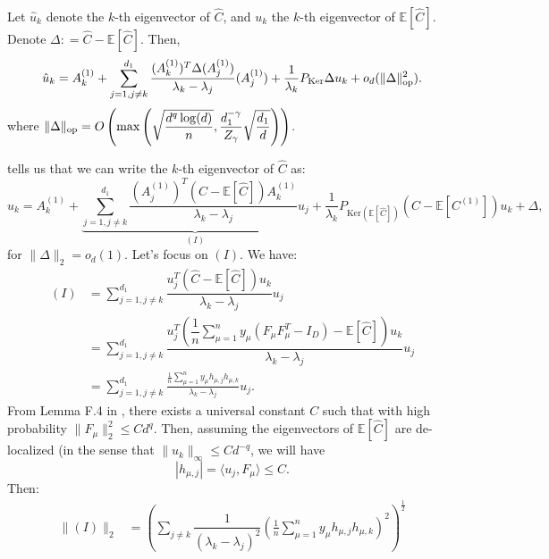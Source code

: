 \documentclass[]{article}
\numberwithin{equation}{section}
\theoremstyle{definition}
\newcommand{\EE}{\mathbb{E}}
\def\op{{\rm op}}
\begin{document}
\begin{lemma}
    Let $\hat{u}_{k}$ denote the $k$-th eigenvector of $\hat{C}$, and $u_{k}$ the $k$-th eigenvector of $\EE[\hat{C}]$. Denote $\Delta: = \hat{C} - \EE[\hat{C}]$. Then, 
    \[
      \hat{u}_{k} = A^{(1)}_{k }+\sum_{j=1, j\not = k}^{d_1} \dfrac{(A^{(1)}_{k})^T \Delta (A^{(1)}_{j})}{\lambda_{k} - \lambda_{j}} (A^{(1)}_{j}) + \dfrac{1}{\lambda_{k}}P_{\mathrm{Ker}} \Delta u_{k} + o_d(\| \Delta\|_\op^2) . 
    \]
    where $\| \Delta\|_\op = O \left ( \max\left ( \sqrt{\dfrac{d^{q}\log(d)}{n}}, \dfrac{d_1^{-\gamma}}{Z_\gamma}\sqrt{\dfrac{d_1}{d}} \right )\right )$. 
    \label{lemma:eigenvector_perturbation_identity}
\end{lemma}

 tells us that we can write the $k$-th eigenvector of $\hat{C}$ as: 
\begin{equation}
    \hat{u}_{k} = A^{(1)}_{k } + \underbrace{\sum_{j=1, j \not = k}^{d_1} \dfrac{(A^{(1)}_{j})^T (\hat{C} - \EE [\hat{C}])A^{(1)}_{k }}{ \lambda_k - \lambda_j } u_j}_{(I)} +\dfrac{1}{\lambda_{k}} P_{\mathrm{Ker}(\EE[\hat{C}])} (\hat{C} - \mathbb{E}[C^{(1)}] ) u_{k} + \Delta, 
    \label{eq:I_II_perturbation}
\end{equation}
for $\| \Delta\|_2 = o_{d}(1)$. Let's focus on $(I)$. We have: 
\begin{align}
    (I) & = \sum_{j=1,j \not = k}^{d_1} \dfrac{u_j^T (\hat{C} - \EE [\hat{C}])u_k}{ \lambda_k - \lambda_j } u_j \\
    & = \sum_{j=1,j \not = k}^{d_1} \dfrac{u_j^T (\dfrac{1}{n}\sum_{\mu = 1}^{n} y_\mu (F_\mu F_\mu^T - I_{D}) - \EE [\hat{C}])u_k}{ \lambda_k - \lambda_j } u_j \\
    & = \sum_{j=1, j \not = k}^{d_1} \frac{\frac{1}{n}\sum_{\mu = 1}^{n} y_\mu h_{\mu,j} h_{\mu, k}}{ \lambda_k - \lambda_j } u_j. 
\end{align}
From Lemma F.4 in \cite{wen2025does}, there exists a universal constant $C$ such that with high probability $\| F_\mu \|_2^2 \leq C d^q$. Then, assuming the eigenvectors of $\EE[\hat{C}]$ are de-localized (in the sense that $\|u_{k}\|_\infty \leq Cd^{-q} $, we will have 
\begin{equation}
    | h_{\mu,j}| = \langle u_j , F_\mu \rangle \leq C. 
\end{equation}
Then: 
\begin{align}
    \| (I) \|_2 &= \left ( \sum_{j \not = k}  \dfrac{1}{(\lambda_k - \lambda_j)^{2}} \left (\frac{1}{n}\sum_{\mu = 1}^{n} y_\mu h_{\mu,j} h_{\mu, k} \right )^{2} \right )^{\frac{1}{2}} \\ 
\end{align}
\end{document}
